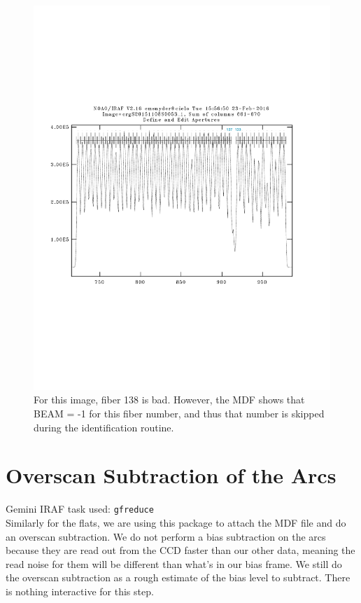 \documentclass[12pt]{report}
\begin{document}
\begin{figure}[h]
\centering
\includegraphics[scale=0.6]{badfiber_num}
\caption[Example Image of a Bad Fiber]{For this image, fiber 138 is bad. However, the MDF shows that BEAM = -1 for this fiber number, and thus that number is skipped during the identification routine.}
\label{fig:bad}
\end{figure}

\bigskip
\section{Overscan Subtraction of the Arcs}

\noindent Gemini IRAF task used: \texttt{gfreduce} \\

\noindent Similarly for the flats, we are using this package to attach the MDF file and do an overscan subtraction. We do not perform a bias subtraction on the arcs because they are read out from the CCD faster than our other data, meaning the read noise for them will be different than what's in our bias frame. We still do the overscan subtraction as a rough estimate of the bias level to subtract. There is nothing interactive for this step. \\
\end{document}
